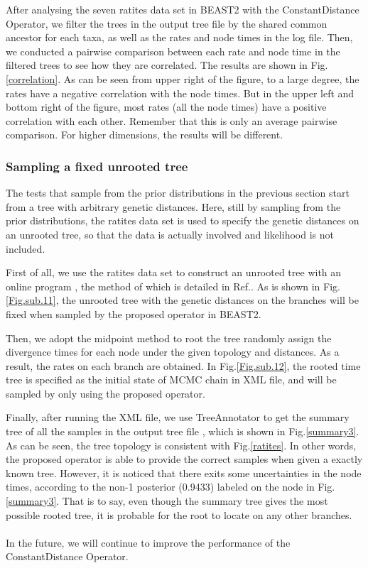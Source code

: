 \documentclass{bmcart}
\begin{document}
After analysing the seven ratites data set in BEAST2 with the ConstantDistance Operator, we filter the trees in the output tree file by the shared common ancestor for each taxa, as well as the rates and node times in the log file. Then, we conducted a pairwise comparison between each rate and node time in the filtered trees to see how they are correlated. The results are shown in Fig.\ref{correlation}. As can be seen from upper right of the figure, to a large degree, the rates have a negative correlation with the node times. But in the upper left and bottom right of the figure, most rates (all the node times) have a positive correlation with each other. Remember that this is only an average pairwise comparison. For higher dimensions, the results will be different. 
\subsubsection*{Sampling a fixed unrooted tree}
The tests that sample from the prior distributions in the previous section start from a tree with arbitrary genetic distances. Here, still by sampling from the prior distributions, the ratites data set is used to specify the genetic distances on an unrooted tree, so that the data is actually involved and likelihood is not included. 

First of all, we use the ratites data set to construct an unrooted tree with an online program \cite{phyml}, the method of which is detailed in Ref.\cite{guindon2010new}.  As is shown in Fig.\ref{Fig.sub.11}, the unrooted tree with the genetic distances on the branches will be fixed when sampled by the proposed operator in BEAST2. 

Then, we adopt the midpoint method to root the tree randomly assign the divergence times for each node under the given topology and distances. As a result, the rates on each branch are obtained. In Fig.\ref{Fig.sub.12}, the rooted time tree is specified as the initial state of MCMC chain in XML file, and will be sampled by only using the proposed operator.

Finally, after running the XML file, we use TreeAnnotator to get the summary tree of all the samples in the output tree file \cite{TreeAnnotator}, which is shown in Fig.\ref{summary3}. As can be seen, the tree topology is consistent with Fig.\ref{ratites}. In other words, the proposed operator is able to provide the correct samples when given a exactly known tree.
However, it is noticed that there exits some uncertainties in the node times, according to the non-1 posterior (0.9433) labeled on the node in Fig.\ref{summary3}. That is to say, even though the summary tree gives the most possible rooted tree, it is probable for the root to locate on any other branches.
\\
\\
In the future, we will continue to improve the performance of the ConstantDistance Operator. 
\end{document}
